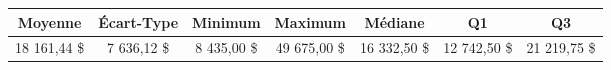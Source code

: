 \begin{tabular}{ccccccc}
    \toprule
    Moyenne & Écart-Type & Minimum & Maximum & Médiane & Q1 & Q3 \\
    \midrule
    18 161,44 \$ & 7 636,12 \$ & 8 435,00 \$ & 49 675,00 \$ & 16 332,50 \$ & 12 742,50 \$ & 21 219,75 \$ \\
    \bottomrule
\end{tabular}